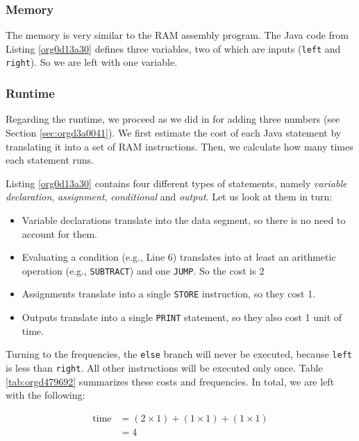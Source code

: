 \documentclass[11pt]{article}
\begin{document}
\subsubsection*{Memory}
\label{sec:org7c03d41}

The memory is very similar to the RAM assembly program. The Java code
from Listing \ref{org0d13a30} defines three variables, two of which
are inputs (\texttt{left} and \texttt{right}). So we are left with one variable.

\subsubsection*{Runtime}
\label{sec:orgde55c23}

Regarding the runtime, we proceed as we did in for adding three
numbers (see Section \ref{sec:orgd3a0041}). We first estimate the cost
of each Java statement by translating it into a set of RAM
instructions. Then, we calculate how many times each statement runs.

Listing \ref{org0d13a30} contains four different types of statements,
namely \emph{variable declaration}, \emph{assignment}, \emph{conditional} and
\emph{output}. Let us look at them in turn:

\begin{itemize}
\item Variable declarations translate into the data segment, so there is
no need to account for them.

\item Evaluating a condition (e.g., Line 6) translates into
at least an arithmetic operation (e.g., \texttt{SUBTRACT}) and one \texttt{JUMP}.
So the cost is 2

\item Assignments translate into a single \texttt{STORE} instruction, so they
cost 1.

\item Outputs translate into a single \texttt{PRINT} statement, so they also cost 1
unit of time.
\end{itemize}

Turning to the frequencies, the \texttt{else} branch will never be executed,
because \texttt{left} is less than \texttt{right}. All other instructions will be
executed only once. Table \ref{tab:orgd479692} summarizes these costs and
frequencies. In total, we are left with the following:

\begin{align*}
   \text{time} &= (2 \times 1) + (1 \times 1) + (1 \times 1) \\
               &= 4 \\
\end{align*}
\end{document}
